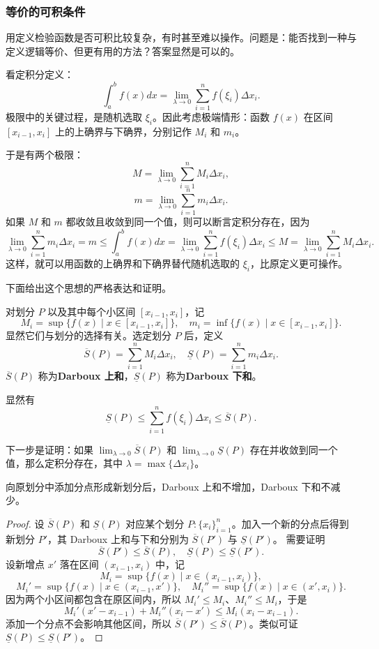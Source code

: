 \subsubsection{等价的可积条件}

用定义检验函数是否可积比较复杂，有时甚至难以操作。问题是：能否找到一种与定义逻辑等价、但更有用的方法？答案显然是可以的。

看定积分定义：
\[
\int_a^b f(x)dx=\lim_{\lambda\to 0}\sum_{i=1}^{n}f(\xi_i)\Delta x_i.
\]
极限中的关键过程，是随机选取 $\xi_i$。因此考虑极端情形：函数 $f(x)$ 在区间 $[x_{i-1},x_i]$ 上的上确界与下确界，分别记作 $M_i$ 和 $m_i$。

于是有两个极限：
\[
M=\lim_{\lambda\to 0}\sum_{i=1}^{n}M_i\Delta x_i,
\]
\[
m=\lim_{\lambda\to 0}\sum_{i=1}^{n}m_i\Delta x_i.
\]
如果 $M$ 和 $m$ 都收敛且收敛到同一个值，则可以断言定积分存在，因为
\[
\lim_{\lambda\to 0}\sum_{i=1}^{n}m_i\Delta x_i=m\le \int_a^b f(x)dx=\lim_{\lambda\to 0}\sum_{i=1}^{n}f(\xi_i)\Delta x_i\le M=\lim_{\lambda\to 0}\sum_{i=1}^{n}M_i\Delta x_i.
\]
这样，就可以用函数的上确界和下确界替代随机选取的 $\xi_i$，比原定义更可操作。

下面给出这个思想的严格表达和证明。

\begin{definition}[Darboux 和]
对划分 $P$ 以及其中每个小区间 $[x_{i-1},x_i]$，记
\[
M_i=\sup\{f(x)\mid x\in[x_{i-1},x_i]\},\quad m_i=\inf\{f(x)\mid x\in[x_{i-1},x_i]\}.
\]
显然它们与划分的选择有关。选定划分 $P$ 后，定义
\[
\overline{S}(P)=\sum_{i=1}^{n}M_i\Delta x_i,
\quad
\underline{S}(P)=\sum_{i=1}^{n}m_i\Delta x_i.
\]
$\overline{S}(P)$ 称为\textbf{Darboux 上和}，$\underline{S}(P)$ 称为\textbf{Darboux 下和}。
\end{definition}

显然有
\[
\underline{S}(P)\le \sum_{i=1}^{n}f(\xi_i)\Delta x_i\le \overline{S}(P).
\]

下一步是证明：如果 $\lim_{\lambda\to 0}\overline{S}(P)$ 和 $\lim_{\lambda\to 0}\underline{S}(P)$ 存在并收敛到同一个值，那么定积分存在，其中 $\lambda=\max\{\Delta x_i\}$。

\begin{lemma}
向原划分中添加分点形成新划分后，Darboux 上和不增加，Darboux 下和不减少。
\end{lemma}

\begin{proof}
设 $\overline{S}(P)$ 和 $\underline{S}(P)$ 对应某个划分 $P:\{x_i\}_{i=1}^{n}$。加入一个新的分点后得到新划分 $P'$，其 Darboux 上和与下和分别为 $\overline{S}(P')$ 与 $\underline{S}(P')$。
需要证明
\[
\overline{S}(P')\le \overline{S}(P),\quad \underline{S}(P)\le \underline{S}(P').
\]
设新增点 $x'$ 落在区间 $(x_{i-1},x_i)$ 中，记
\[
M_i=\sup\{f(x)\mid x\in(x_{i-1},x_i)\},
\]
\[
M_i'=\sup\{f(x)\mid x\in(x_{i-1},x')\},\quad
M_i''=\sup\{f(x)\mid x\in(x',x_i)\}.
\]
因为两个小区间都包含在原区间内，所以 $M_i'\le M_i$、$M_i''\le M_i$，于是
\[
M_i'(x'-x_{i-1})+M_i''(x_i-x')\le M_i(x_i-x_{i-1}).
\]
添加一个分点不会影响其他区间，所以 $\overline{S}(P')\le \overline{S}(P)$。类似可证 $\underline{S}(P)\le \underline{S}(P')$。
\end{proof}

